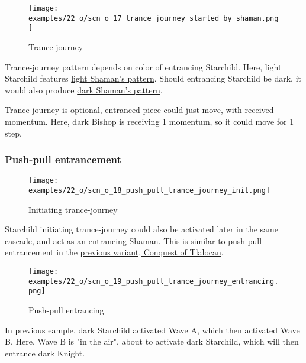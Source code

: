 \clearpage %

\vspace*{-2.1\baselineskip}
\noindent
\begin{figure}[!h]
\texttt{[image: examples/22\_o/scn\_o\_17\_trance\_journey\_started\_by\_shaman.png]}
\caption{Trance-journey}
\label{fig:scn_o_17_trance_journey_started_by_shaman}
\end{figure}

Trance-journey pattern depends on color of entrancing Starchild. Here, light Starchild features
\hyperref[fig:scn_cot_14_light_shaman_trance_journey]{light Shaman's pattern}. Should entrancing
Starchild be dark, it would also produce
\hyperref[fig:scn_cot_16_dark_shaman_trance_journey]{dark Shaman's pattern}.

Trance-journey is optional, entranced piece could just move, with received momentum.
Here, dark Bishop is receiving 1 momentum, so it could move for 1 step.

\clearpage %

\subsubsection*{Push-pull entrancement}

\vspace*{-0.9\baselineskip}
\noindent
\begin{wrapfigure}[7]{l}{0.4\textwidth}
\centering
\texttt{[image: examples/22\_o/scn\_o\_18\_push\_pull\_trance\_journey\_init.png]}
\caption{Initiating trance-journey}
\label{fig:scn_o_18_push_pull_trance_journey_init}
\end{wrapfigure}
Starchild initiating trance-journey could also be activated later in the same cascade, and act as an
entrancing Shaman. This is similar to push-pull entrancement in the
\hyperref[fig:star/scn_cot_33_push_pull_entrancement_start]{previous variant, Conquest of Tlalocan}.

\vspace*{3.9\baselineskip}
\noindent
\begin{wrapfigure}[10]{l}{0.4\textwidth}
\centering
\texttt{[image: examples/22\_o/scn\_o\_19\_push\_pull\_trance\_journey\_entrancing.png]}
\caption{Push-pull entrancing}
\label{fig:scn_o_19_push_pull_trance_journey_entrancing}
\end{wrapfigure}
In previous eample, dark Starchild activated Wave A, which then activated Wave B. Here, Wave B is
"in the air", about to activate dark Starchild, which will then entrance dark Knight.


